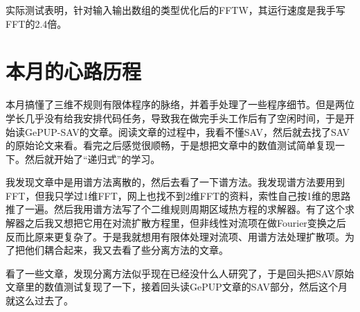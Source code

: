 \documentclass[lang=cn,10pt,bibend=bibtex]{elegantbook}
\begin{document}
实际测试表明，针对输入输出数组的类型优化后的FFTW，其运行速度是我手写FFT的2.4倍。

\newpage

\chapter{本月的心路历程}

本月搞懂了三维不规则有限体程序的脉络，并着手处理了一些程序细节。但是两位学长几乎没有给我安排代码任务，导致我在做完手头工作后有了空闲时间，于是开始读GePUP-SAV的文章。阅读文章的过程中，我看不懂SAV，然后就去找了SAV的原始论文来看。看完之后感觉很顺畅，于是想把文章中的数值测试简单复现一下。然后就开始了“递归式”的学习。

我发现文章中是用谱方法离散的，然后去看了一下谱方法。我发现谱方法要用到FFT，但我只学过1维FFT，网上也找不到2维FFT的资料，索性自己按1维的思路推了一遍。然后我用谱方法写了个二维规则周期区域热方程的求解器。有了这个求解器之后我又想把它用在对流扩散方程里，但非线性对流项在做Fourier变换之后反而比原来更复杂了。于是我就想用有限体处理对流项、用谱方法处理扩散项。为了把他们耦合起来，我又去看了些分离方法的文章。

看了一些文章，发现分离方法似乎现在已经没什么人研究了，于是回头把SAV原始文章里的数值测试复现了一下，接着回头读GePUP文章的SAV部分，然后这个月就这么过去了。
\end{document}

